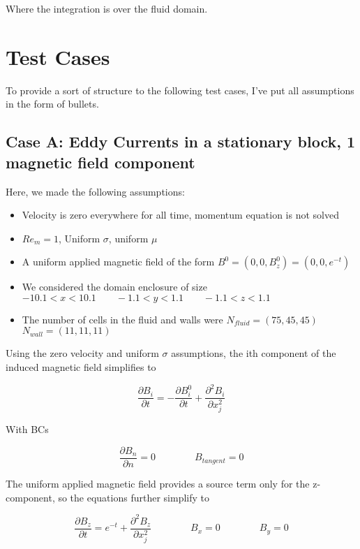 \documentclass[11pt]{article}
\begin{document}
Where the integration is over the fluid domain.

\section{Test Cases}
To provide a sort of structure to the following test cases, I've put all assumptions in the form of bullets.

\subsection{Case A: Eddy Currents in a stationary block, 1 magnetic field component}
Here, we made the following assumptions:

\begin{itemize}
\item Velocity is zero everywhere for all time, momentum equation is not solved
\item $Re_m = 1$, Uniform $\sigma$, uniform $\mu$
\item A uniform applied magnetic field of the form $B^0 = (0,0,B_z^0) = (0,0,e^{-t})$
\item We considered the domain enclosure of size $-10.1 < x < 10.1 \qquad -1.1 < y < 1.1 \qquad -1.1 < z < 1.1$
\item The number of cells in the fluid and walls were $N_{fluid} = (75,45,45)$ \qquad $N_{wall} = (11,11,11)$
\end{itemize}

Using the zero velocity and uniform $\sigma$ assumptions, the ith component of the induced magnetic field simplifies to

\begin{equation}
	\frac{\partial B_i}{\partial t} 
	=
	-
	\frac{\partial B_i^0}{\partial t}
	+
	\frac{\partial^2 B_i}{\partial x_j^2} 
\end{equation}

With BCs

\begin{equation}
	\frac{\partial B_{n}}{\partial n} = 0
	\qquad \qquad
	B_{tangent} = 0
\end{equation}

The uniform applied magnetic field provides a source term only for the z-component, so the equations further simplify to

\begin{equation}
	\frac{\partial B_z}{\partial t} 
	=
	e^{-t}
	+
	\frac{\partial^2 B_z}{\partial x_j^2} 
	\qquad \qquad
	B_x = 0
	\qquad \qquad
	B_y = 0
\end{equation}
\end{document}
